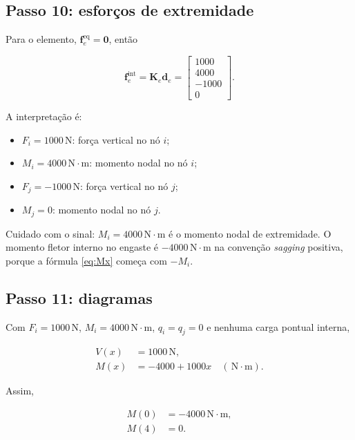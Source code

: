 \documentclass[12pt,a4paper]{article}
\newcommand{\unit}[1]{\,\mathrm{#1}}
\begin{document}
\subsection{Passo 10: esforços de extremidade}

Para o elemento, \(\mathbf{f}_e^{\text{eq}}=\mathbf{0}\), então

\begin{equation}
  \mathbf{f}_e^{\text{int}} = \mathbf{K}_e\mathbf{d}_e
  =
  \begin{bmatrix}
    1000\\4000\\-1000\\0
  \end{bmatrix}.
  \label{eq:ex_endforces}
\end{equation}

A interpretação é:

\begin{itemize}[leftmargin=1.5em]
  \item \(F_i=1000\unit{N}\): força vertical no nó \(i\);
  \item \(M_i=4000\unit{N\cdot m}\): momento nodal no nó \(i\);
  \item \(F_j=-1000\unit{N}\): força vertical no nó \(j\);
  \item \(M_j=0\): momento nodal no nó \(j\).
\end{itemize}

Cuidado com o sinal: \(M_i=4000\unit{N\cdot m}\) é o momento nodal de extremidade. O momento fletor interno no engaste é \(-4000\unit{N\cdot m}\) na convenção \emph{sagging} positiva, porque a fórmula \eqref{eq:Mx} começa com \(-M_i\).

\subsection{Passo 11: diagramas}

Com \(F_i=1000\unit{N}\), \(M_i=4000\unit{N\cdot m}\), \(q_i=q_j=0\) e nenhuma carga pontual interna,

\begin{align}
  V(x) &= 1000\unit{N}, \label{eq:ex_V}\\
  M(x) &= -4000 + 1000x \quad (\unit{N\cdot m}). \label{eq:ex_M}
\end{align}

Assim,

\begin{align}
  M(0) &= -4000\unit{N\cdot m}, \label{eq:ex_M0}\\
  M(4) &= 0. \label{eq:ex_M4}
\end{align}
\end{document}
